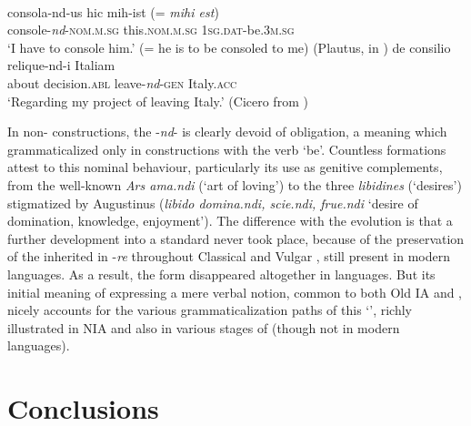 \documentclass[output=paper]{langsci/langscibook}
\begin{document}
\ea\label{ex:montaut:45}
\ea \label{ex:montaut:45a}   
\\
\gll consola-nd-us hic  mih-ist   (= \textit{mihi est})  \\
console-\textit{nd}{}-\textsc{nom.m.sg}   this.\textsc{nom.m.sg}   \textsc{1sg.dat}{}-be.\textsc{3m.sg} \\
\glt ‘I have to console him.’ (= he is to be consoled to me) 
(Plautus, in \citealt[165]{Touratier1994})
\ex  \label{ex:montaut:45b}
\gll de consilio relique-nd-i  Italiam\\
 about   decision.\textsc{abl}   leave-\textit{nd}{}-\textsc{gen}   Italy.\textsc{acc} \\
\glt ‘Regarding my project of leaving Italy.’ (Cicero from \citealt[165]{Touratier1994})
\z 
\z 

In non- constructions, the -\textit{nd}{}-  is clearly devoid of obligation, a meaning which grammaticalized only in  constructions with the verb ‘be’.{} Countless formations attest to this nominal behaviour, particularly its use as genitive complements, from the well-known \textit{Ars ama.ndi} (‘art of loving’) to the three \textit{libidines} (‘desires’) stigmatized by Augustinus (\textit{libido domina.ndi, scie.ndi, frue.ndi} ‘desire {of domination, knowledge, enjoyment’}). The difference with the  evolution is that a further development into a standard  never took place, because of the preservation of the inherited  in -\textit{re} throughout Classical and Vulgar , still present in modern  languages. As a result, the  form disappeared altogether in  languages. But its initial meaning of expressing a mere verbal notion, common to both Old IA and , nicely accounts for the various grammaticalization paths of this ‘’, richly illustrated in NIA and also in various stages of  (though not in modern  languages). 

\section{Conclusions}\label{sec:montaut:5}
\end{document}
